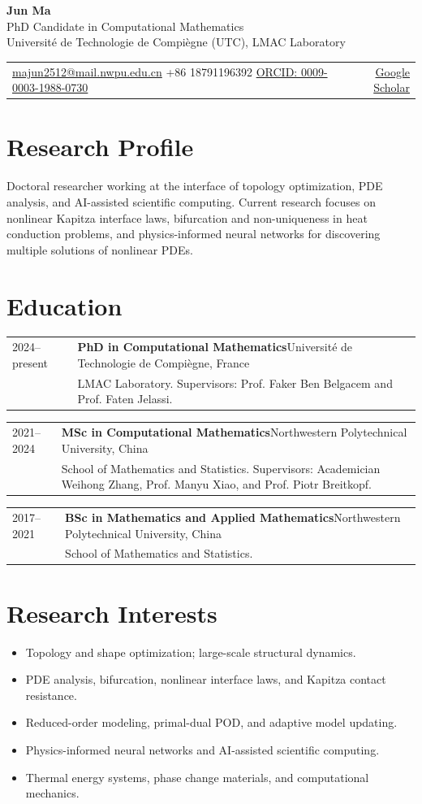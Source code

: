 \documentclass[8pt,a4paper]{extarticle}
\makeatletter
\newcommand{\cvitem}[4]{%
  \begin{tabularx}{\textwidth}{@{}p{1.85cm}X@{}}
    {\color{lightgray}\small #1} &
    \textbf{#2}{\color{lightgray}\small\quad #3}\\
    & {\color{textgray}\small #4}
  \end{tabularx}\vspace{0.1em}
}
\newcommand{\compactlist}{%
  \begin{itemize}[leftmargin=1em,itemsep=0.04em,topsep=0.05em]
}
\newcommand{\finishcompactlist}{\end{itemize}}
\makeatother
\begin{document}
{\LARGE\bfseries Jun Ma}\\[0.18em]
{\normalsize PhD Candidate in Computational Mathematics}\\[0.25em]
{\color{textgray}Universit\'e de Technologie de Compi\`egne (UTC), LMAC Laboratory}\\[0.4em]
\begin{tabularx}{\textwidth}{@{}Xr@{}}
  \href{mailto:majun2512@mail.nwpu.edu.cn}{majun2512@mail.nwpu.edu.cn} \quad
  +86 18791196392 \quad
  \href{https://orcid.org/0009-0003-1988-0730}{ORCID: 0009-0003-1988-0730}
  &
  \href{https://scholar.google.com/citations?user=Gzmt1REAAAAJ}{Google Scholar}
\end{tabularx}

\section{Research Profile}
Doctoral researcher working at the interface of topology optimization, PDE analysis, and AI-assisted scientific computing. Current research focuses on nonlinear Kapitza interface laws, bifurcation and non-uniqueness in heat conduction problems, and physics-informed neural networks for discovering multiple solutions of nonlinear PDEs.

\section{Education}
\cvitem{2024--present}{PhD in Computational Mathematics}{Universit\'e de Technologie de Compi\`egne, France}{LMAC Laboratory. Supervisors: Prof. Faker Ben Belgacem and Prof. Faten Jelassi.}
\cvitem{2021--2024}{MSc in Computational Mathematics}{Northwestern Polytechnical University, China}{School of Mathematics and Statistics. Supervisors: Academician Weihong Zhang, Prof. Manyu Xiao, and Prof. Piotr Breitkopf.}
\cvitem{2017--2021}{BSc in Mathematics and Applied Mathematics}{Northwestern Polytechnical University, China}{School of Mathematics and Statistics.}

\section{Research Interests}
\compactlist
  \item Topology and shape optimization; large-scale structural dynamics.
  \item PDE analysis, bifurcation, nonlinear interface laws, and Kapitza contact resistance.
  \item Reduced-order modeling, primal-dual POD, and adaptive model updating.
  \item Physics-informed neural networks and AI-assisted scientific computing.
  \item Thermal energy systems, phase change materials, and computational mechanics.
\finishcompactlist
\end{document}
